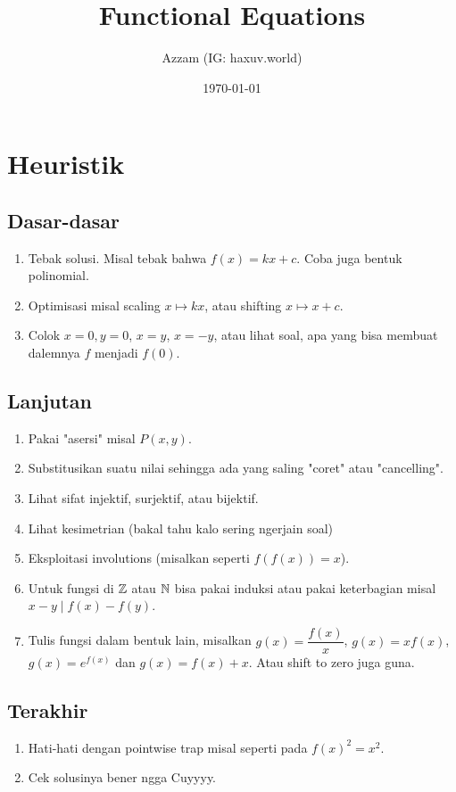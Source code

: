 \documentclass[11pt]{scrartcl}
\title{Functional Equations}
\author{Azzam (IG: haxuv.world)}
\date{\today}
\begin{document}
\maketitle

\section{Heuristik}
\subsection{Dasar-dasar}
\begin{enumerate}
    \item Tebak solusi. Misal tebak bahwa $f(x)=kx+c$. Coba juga bentuk polinomial.
    \item Optimisasi misal scaling $x \mapsto kx$, atau shifting $x \mapsto x + c$.
    \item Colok $x=0, y=0$, $x=y$, $x=-y$, atau lihat soal, apa yang bisa membuat dalemnya $f$ menjadi $f(0)$.
\end{enumerate}

\subsection{Lanjutan}
\begin{enumerate}
    \item Pakai "asersi" misal $P(x,y)$.
    \item Substitusikan suatu nilai sehingga ada yang saling "coret" atau "cancelling".
    \item Lihat sifat injektif, surjektif, atau bijektif.
    \item Lihat kesimetrian (bakal tahu kalo sering ngerjain soal)
    \item Eksploitasi involutions (misalkan seperti $f(f(x))=x$).
    \item Untuk fungsi di $\mathbb Z$ atau $\mathbb N$ bisa pakai induksi atau pakai keterbagian misal $x-y \mid f(x)-f(y)$.
    \item Tulis fungsi dalam bentuk lain, misalkan $g(x)=\dfrac{f(x)}{x}$, $g(x)=xf(x)$, $g(x)=e^{f(x)}$ dan $g(x)=f(x)+x$. Atau shift to zero juga guna.
\end{enumerate}

\subsection{Terakhir}
\begin{enumerate}
    \item Hati-hati dengan pointwise trap misal seperti pada $f(x)^2=x^2$.
    \item Cek solusinya bener ngga Cuyyyy.
\end{enumerate}
\end{document}
